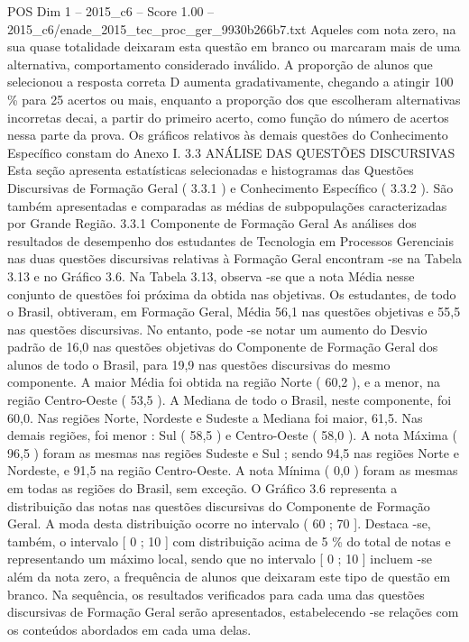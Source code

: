 \begin{textsample}{POS Dim 1 – 2015\_c6 – Score 1.00 – 2015\_c6/enade\_2015\_tec\_proc\_ger\_9930b266b7.txt}
Aqueles com nota zero, na sua quase totalidade deixaram esta questão em branco ou marcaram mais de uma alternativa, comportamento considerado inválido.
A proporção de alunos que selecionou a resposta correta D aumenta gradativamente, chegando a atingir 100 \% para 25 acertos ou mais, enquanto a proporção dos que escolheram alternativas incorretas decai, a partir do primeiro acerto, como função do número de acertos nessa parte da prova.
Os gráficos relativos às demais questões do Conhecimento Específico constam do Anexo I. 3.3 ANÁLISE DAS QUESTÕES DISCURSIVAS Esta seção apresenta estatísticas selecionadas e histogramas das Questões Discursivas de Formação Geral ( 3.3.1 ) e Conhecimento Específico ( 3.3.2 ).
São também apresentadas e comparadas as médias de subpopulações caracterizadas por Grande Região. 3.3.1 Componente de Formação Geral As análises dos resultados de desempenho dos estudantes de Tecnologia em Processos Gerenciais nas duas questões discursivas relativas à Formação Geral encontram -se na Tabela 3.13 e no Gráfico 3.6.
Na Tabela 3.13, observa -se que a nota Média nesse conjunto de questões foi próxima da obtida nas objetivas.
Os estudantes, de todo o Brasil, obtiveram, em Formação Geral, Média 56,1 nas questões objetivas e 55,5 nas questões discursivas.
No entanto, pode -se notar um aumento do Desvio padrão de 16,0 nas questões objetivas do Componente de Formação Geral dos alunos de todo o Brasil, para 19,9 nas questões discursivas do mesmo componente.
A maior Média foi obtida na região Norte ( 60,2 ), e a menor, na região Centro-Oeste ( 53,5 ).
A Mediana de todo o Brasil, neste componente, foi 60,0.
Nas regiões Norte, Nordeste e Sudeste a Mediana foi maior, 61,5.
Nas demais regiões, foi menor : Sul ( 58,5 ) e Centro-Oeste ( 58,0 ).
A nota Máxima ( 96,5 ) foram as mesmas nas regiões Sudeste e Sul ; sendo 94,5 nas regiões Norte e Nordeste, e 91,5 na região Centro-Oeste.
A nota Mínima ( 0,0 ) foram as mesmas em todas as regiões do Brasil, sem exceção.
O Gráfico 3.6 representa a distribuição das notas nas questões discursivas do Componente de Formação Geral.
A moda desta distribuição ocorre no intervalo ( 60 ; 70 ].
Destaca -se, também, o intervalo [ 0 ; 10 ] com distribuição acima de 5 \% do total de notas e representando um máximo local, sendo que no intervalo [ 0 ; 10 ] incluem -se além da nota zero, a frequência de alunos que deixaram este tipo de questão em branco.
Na sequência, os resultados verificados para cada uma das questões discursivas de Formação Geral serão apresentados, estabelecendo -se relações com os conteúdos abordados em cada uma delas.

\end{textsample}
